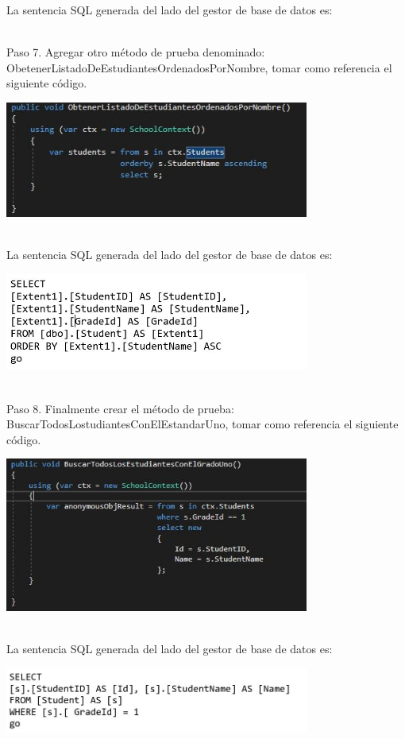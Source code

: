 La sentencia SQL generada del lado del gestor de base de datos es: 


\textbf{}\\

Paso 7. Agregar otro método de prueba denominado: ObetenerListadoDeEstudiantesOrdenadosPorNombre, tomar
como referencia el siguiente código.

\begin{center}
	\includegraphics[width=10cm]{./Imagenes/Captura6} 
	\end{center}
\textbf{}\\

La sentencia SQL generada del lado del gestor de base de datos es: 

\begin{center}
	\includegraphics[width=10cm]{./Imagenes/U1-4} 
	\end{center}
\textbf{}\\

Paso 8. Finalmente crear el método de prueba: BuscarTodosLostudiantesConElEstandarUno, tomar como
referencia el siguiente código.

\begin{center}
	\includegraphics[width=10cm]{./Imagenes/Captura7} 
	\end{center}
\textbf{}\\

La sentencia SQL generada del lado del gestor de base de datos es: 

\begin{center}
	\includegraphics[width=10cm]{./Imagenes/U1-5} 
	\end{center}
\textbf{}\\
\textbf{}\\
\textbf{}\\
